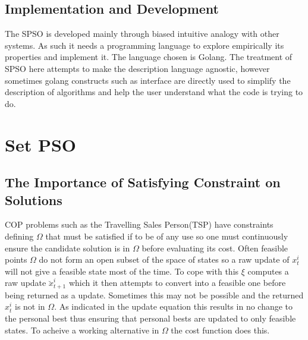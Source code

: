 \documentclass[a4paper,oneside,english]{book}
\numberwithin{equation}{section}
\numberwithin{figure}{section}
\begin{document}
\subsection{Implementation and Development}
The SPSO is developed mainly through biased intuitive analogy with  other systems. As such it needs a programming language to explore empirically its properties and implement it. The language chosen is Golang. The treatment of SPSO here attempts to make the description language agnostic, however sometimes golang constructs such as interface are directly used to simplify the description of algorithms and help the user understand what the code is trying to do.     

\section{Set PSO}

\subsection{The Importance of Satisfying Constraint on Solutions }
COP problems such as the Travelling Sales Person(TSP) have constraints defining $\varOmega$ that must be satisfied if to be of any use so one must continuously ensure the candidate solution is in $\varOmega$ before evaluating its cost. Often feasible points $\varOmega$ do not form an open subset of the space of states so a raw update of $x_t^i$ will not give a feasible state most of the time. To cope with this $\xi$ computes a raw update $\breve{x}_{t+1}^i$ which it then attempts to  convert into a feasible one before being returned as a update. Sometimes this may not be possible and the returned $x_t^i$ is not in $\varOmega$. As indicated in the update equation this results in no change to the personal best thus ensuring that personal bests are updated to only feasible states.   To acheive a working alternative  in $\varOmega$ the  cost function does this. 
\end{document}
